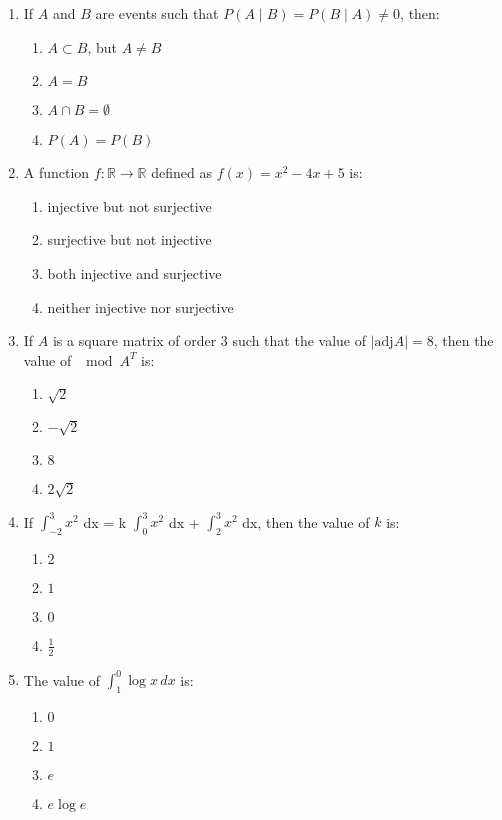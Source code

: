 \documentclass{article}
\begin{document}
\begin{enumerate}
   \item If $A$ and $B$ are events such that $P(A \mid B) = P(B \mid A) \neq 0$, then:

    \begin{enumerate}[label=(\alph*)]
        \item $A \subset B$, but $A \neq B$
        \item $A = B$
        \item $A \cap B = \emptyset$
        \item $P(A) = P(B)$
    \end{enumerate}

    \item A function $f: \mathbb{R} \to \mathbb{R}$ defined as $f(x) = x^2-4x+5$ is:
    \begin{enumerate}[label=(\alph*)]
        \item injective but not surjective
        \item surjective but not injective
        \item both injective and surjective
        \item neither injective nor surjective
    \end{enumerate}

    \item If $A$ is a square matrix of order 3 such that the value of $|\text{adj} A| = 8$, then the value of $\mod{A^T}$ is:
    \begin{enumerate}[label=(\alph*)]
        \item $\sqrt{2}$
        \item $-\sqrt{2}$
        \item ${8}$
        \item $2 \sqrt{2}$
    \end{enumerate}

    \item If  $\int_{-2}^{3} x^2$ dx = k  $\int_0^3 x^2$ dx +  $\int_2^3 x^2$ dx, then the value of $k$ is:
    \begin{enumerate}[label=(\alph*)]
        \item $2$
        \item $1$
        \item $0$
        \item $\frac{1}{2}$
    \end{enumerate}

    \item The value of $\int_{1}^{0} \log x \, dx$ is:
    \begin{enumerate}[label=(\alph*)]
        \item $0$
        \item $1$
        \item $e$
        \item $e \log e$
    \end{enumerate}


\end{enumerate}
\end{document}
